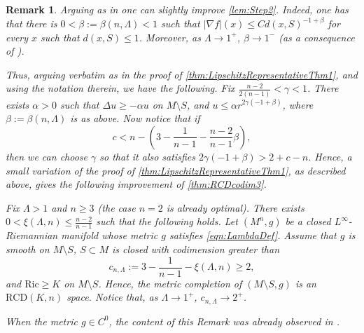 \documentclass[12pt,a4paper,reqno]{amsart}
\newtheorem{remark}[theorem]{Remark}
\renewcommand{\leq}{\leqslant}
\renewcommand{\geq}{\geqslant}
\begin{document}
\begin{remark}\label{rem:Better-on-Lambda}
    Arguing as in \cite[Lemma 2.7]{DWWW} one can slightly improve \cref{lem:Step2}. Indeed, one has that there is $0<\beta:=\beta(n,\Lambda)<1$ such that $|\nabla f|(x)\leq Cd(x,S)^{-1+\beta}$ for every $x$ such that $d(x,S)\leq 1$. Moreover, as $\Lambda\to 1^+$, $\beta\to 1^-$ (as a consequence of \cite[Theorem 1.5]{ByunWang}).

    Thus, arguing verbatim as in the proof of \cref{thm:LipschitzRepresentativeThm1}, and using the notation therein, we have the following. Fix $\frac{n-2}{2(n-1)}<\gamma<1$. There exists $\alpha>0$ such that $\Delta u\geq -\alpha u$ on $M\setminus S$, and $u\leq \alpha r^{2\gamma(-1+\beta)}$, where $\beta:=\beta(n,\Lambda)$ is as above. Now notice that if 
    $$
    c<n-\left(3-\frac{1}{n-1}-\frac{n-2}{n-1}\beta\right),
    $$ 
    then we can choose $\gamma$ so that it also satisfies $2\gamma(-1+\beta)>2+c-n$. Hence, a small variation of the proof of \cref{thm:LipschitzRepresentativeThm1}, as described above, gives the following improvement of \cref{thm:RCDcodim3}. 
    
    Fix $\Lambda>1$ and $n\geq 3$ (the case $n=2$ is already optimal). There exists $0< \xi(\Lambda,n)\leq \frac{n-2}{n-1}$ such that the following holds. Let $(M^n,g)$ be a closed $L^\infty$-Riemannian manifold whose metric $g$ satisfies \eqref{eqn:LambdaDef}. Assume that $g$ is smooth on $M\setminus S$, $S\subset M$ is closed with codimension greater than 
    $$
    c_{n,\Lambda}:=3-\frac{1}{n-1}-\xi(\Lambda,n)\geq 2,
    $$
    and $\mathrm{Ric}\geq K$ on $M\setminus S$. Hence, the metric completion of $(M\setminus S,g)$ is an $\mathrm{RCD}(K,n)$ space. Notice that, as $\Lambda\to 1^+$, $c_{n,\Lambda}\to 2^+$.

    When the metric $g\in C^0$, the content of this Remark was already observed in \cite[Remark 2.8]{DWWW}.
\end{remark}
\end{document}
